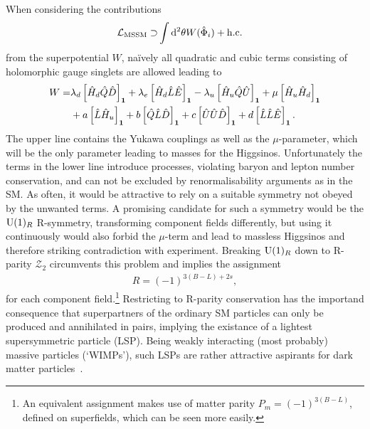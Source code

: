 \noindent When considering the contributions
\begin{align}
  \mathcal{L}_\mathrm{MSSM}\supset&\int\dd^2\theta W(\hat{\Phi}_i)+\mathrm{h. c.}
\end{align}
from the superpotential $W$, naïvely all quadratic and cubic terms consisting of holomorphic gauge singlets are allowed leading to
\begin{align}\nonumber
  W=&\lambda_d\left[\hat{H}_d\hat{Q}\hat{D}\right]_{\mathbf{1}}+\lambda_e\left[\hat{H}_d\hat{L}\hat{E}\right]_{\mathbf{1}}-\lambda_u\left[\hat{H}_u\hat{Q}\hat{U}\right]_{\mathbf{1}}+\mu \left[\hat{H}_u\hat{H}_d\right]_{\mathbf{1}}\\
  &+a\left[\hat{L}\hat{H}_u\right]_{\mathbf{1}}+b\left[\hat{Q}\hat{L}\hat{D}\right]_{\mathbf{1}}+c\left[\hat{U}\hat{U}\hat{D}\right]_{\mathbf{1}}+d\left[\hat{L}\hat{L}\hat{E}\right]_{\mathbf{1}}.
\end{align}
The upper line contains the Yukawa couplings as well as the $\mu$-parameter, which will be the only parameter leading to masses for the Higgsinos.
Unfortunately the terms in the lower line introduce processes, violating baryon and lepton number conservation, and can not be excluded by renormalisability arguments as in the SM. As often, it would be attractive to rely on a suitable symmetry not obeyed by the unwanted terms. A promising candidate for such a symmetry would be the $\mathrm{U}(1)_R$ R-symmetry, transforming component fields differently, but using it continuously would also forbid the $\mu$-term and lead to massless Higgsinos and therefore striking contradiction with experiment. Breaking $\mathrm{U}(1)_R$ down to R-parity $\mathcal{Z}_2$ circumvents this problem and implies the assignment
\begin{align}
R=(-1)^{3(B-L)+2s},
\end{align}
for each component field.\footnote{An equivalent assignment makes use of matter parity \mbox{$P_m=(-1)^{3(B-L)}$}, defined on superfields, which can be seen more easily.}
Restricting to R-parity conservation has the importand consequence that superpartners of the ordinary SM particles can only be produced and annihilated in pairs, implying the existance of a lightest supersymmetric particle (LSP). Being weakly interacting (most probably) massive particles (`WIMPs'), such LSPs are rather attractive aspirants for dark matter particles~\cite{pdg, arthur, primer, abc}.

